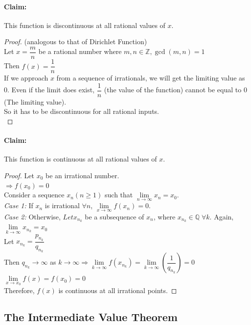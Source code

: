 \documentclass[14]{article}
\theoremstyle{definition}
\begin{document}
\paragraph{Claim:} This function is discontinuous at all rational values of $x$.
\begin{proof}(analogous to that of Dirichlet Function)\\
Let $x = \dfrac{m}{n}$ be a rational number where $m, n \in \mathbb{Z}, \gcd(m, n) = 1$\\
Then $f(x) = \dfrac{1}{n}$\\
If we approach $x$ from a sequence of irrationals, we will get the limiting value as $0$. Even if the limit does exist, $\dfrac{1}{n}$ (the value of the function) cannot be equal to $0$ (The limiting value).\\
So it has to be discontinuous for all rational inputs.\\
\end{proof}
\paragraph{Claim:} This function is continuous at all rational values of $x$.
\begin{proof}
Let $x_0$ be an irrational number.\\
$\Rightarrow f(x_0) = 0$\\
Consider a sequence $x_n (n \geq 1)$ such that $\lim\limits_{n \to \infty} x_n = x_0$.\\
\textit{Case 1:} If $x_n$ is irrational $\forall n$, $\lim\limits_{x \to \infty} f(x_n) = 0$.\\
\textit{Case 2:} Otherwise, $Let x_{n_k}$ be a subsequence of $x_n$, where $x_{n_k} \in \mathbb{Q}\; \forall k$. Again, $\lim\limits_{k \to \infty} x_{n_k} = x_0$\\
Let $x_{n_k} = \dfrac{p_{n_k}}{q_{n_k}}$\\
Then $q_{n_k} \to \infty$ as $k \to \infty \Rightarrow \lim\limits_{k \to \infty}f(x_{n_k}) = \lim\limits_{k \to \infty}\left(\dfrac{1}{q_{n_k}}\right) = 0$\\
$\lim\limits_{x \to x_0} f(x) = f(x_0) = 0$\\
Therefore, $f(x)$ is continuous at all irrational points.
\end{proof}
\pagebreak
\subsection{The Intermediate Value Theorem}
\end{document}
